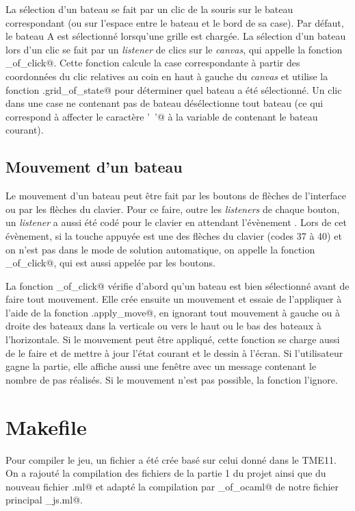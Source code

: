 \documentclass[a4paper,12pt]{article}
\begin{document}
La sélection d'un bateau se fait par un clic de la souris sur le bateau correspondant (ou sur l'espace entre le bateau et le bord de sa case). Par défaut, le bateau A est sélectionné lorsqu'une grille est chargée. La sélection d'un bateau lors d'un clic se fait par un \emph{listener} de clics sur le \emph{canvas}, qui appelle la fonction \verb@boat_of_click@. Cette fonction calcule la case correspondante à partir des coordonnées du clic relatives au coin en haut à gauche du \emph{canvas} et utilise la fonction \verb@Port.grid_of_state@ pour déterminer quel bateau a été sélectionné. Un clic dans une case ne contenant pas de bateau désélectionne tout bateau (ce qui correspond à affecter le caractère \verb@'~'@ à la variable de \verb@main@ contenant le bateau courant).

\subsection{Mouvement d'un bateau}

Le mouvement d'un bateau peut être fait par les boutons de flèches de l'interface ou par les flèches du clavier. Pour ce faire, outre les \emph{listeners} de chaque bouton, un \emph{listener} a aussi été codé pour le clavier en attendant l'évènement \verb@keydown@. Lors de cet évènement, si la touche appuyée est une des flèches du clavier (codes 37 à 40) et on n'est pas dans le mode de solution automatique, on appelle la fonction \verb@move_of_click@, qui est aussi appelée par les boutons.

La fonction \verb@move_of_click@ vérifie d'abord qu'un bateau est bien sélectionné avant de faire tout mouvement. Elle crée ensuite un mouvement et essaie de l'appliquer à l'aide de la fonction \verb@Moves.apply_move@, en ignorant tout mouvement à gauche ou à droite des bateaux dans la verticale ou vers le haut ou le bas des bateaux à l'horizontale. Si le mouvement peut être appliqué, cette fonction se charge aussi de le faire et de mettre à jour l'état courant et le dessin à l'écran. Si l'utilisateur gagne la partie, elle affiche aussi une fenêtre avec un message contenant le nombre de pas réalisés. Si le mouvement n'est pas possible, la fonction l'ignore.

\section{Makefile}

Pour compiler le jeu, un fichier \verb@Makefile@ a été crée basé sur celui donné dans le TME11. On a rajouté la compilation des fichiers de la partie 1 du projet ainsi que du nouveau fichier \verb@maps.ml@ et adapté la compilation par \verb@js_of_ocaml@ de notre fichier principal \verb@ocaml_js.ml@.
\end{document}
